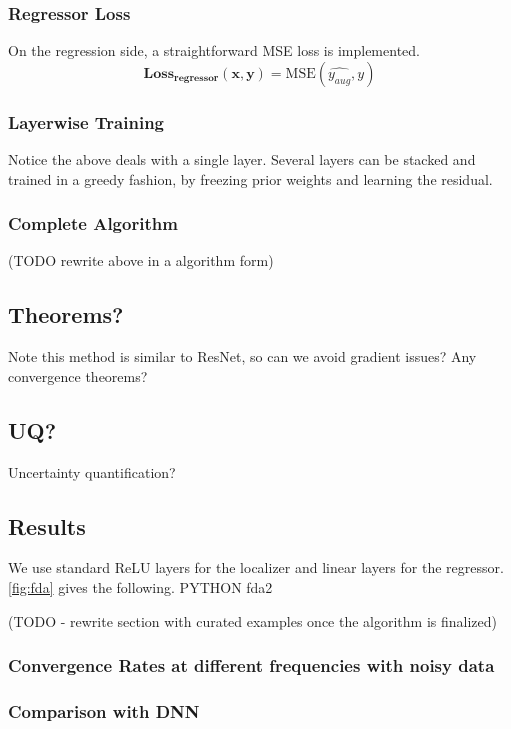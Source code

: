 \subsubsection{Regressor Loss}
On the regression side, a straightforward MSE loss is implemented.
\[
\mathbf{\text{Loss}_\text{regressor}(x,y)} = \text{MSE}(\hat{y_{aug}},y)
\]

\subsubsection{Layerwise Training}
Notice the above deals with a single layer. Several layers can be stacked and trained in a greedy fashion, by freezing prior weights and learning the residual.

\subsubsection{Complete Algorithm}
(TODO rewrite above in a algorithm form)

\subsection{Theorems?}
Note this method is similar to ResNet, so can we avoid gradient issues?
Any convergence theorems?
\subsection{UQ?}
Uncertainty quantification?

\subsection{Results}
We use standard ReLU layers for the localizer and linear layers for the regressor. \ref{fig:fda} gives the following.
PYTHON fda2

(TODO - rewrite section with curated examples once the algorithm is finalized)

\subsubsection{Convergence Rates at different frequencies with noisy data}




\subsubsection{Comparison with DNN}

